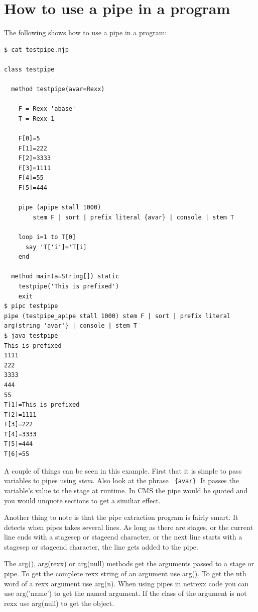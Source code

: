 \section{How to use a pipe in a \nr{} program}

The following shows how to use a pipe in a \nr{} program:

\begin{lstlisting}
$ cat testpipe.njp

class testpipe

  method testpipe(avar=Rexx)

    F = Rexx 'abase'
    T = Rexx 1

    F[0]=5
    F[1]=222
    F[2]=3333
    F[3]=1111
    F[4]=55
    F[5]=444

    pipe (apipe stall 1000)
        stem F | sort | prefix literal {avar} | console | stem T

    loop i=1 to T[0]
      say 'T['i']='T[i]
    end

  method main(a=String[]) static
    testpipe('This is prefixed')
    exit
$ pipc testpipe
pipe (testpipe_apipe stall 1000) stem F | sort | prefix literal arg(string 'avar'} | console | stem T
$ java testpipe
This is prefixed
1111
222
3333
444
55
T[1]=This is prefixed
T[2]=1111
T[3]=222
T[4]=3333
T[5]=444
T[6]=55
\end{lstlisting}

 A couple of things can be seen in this example.  First that it is
 simple to pass \nr{} variables to pipes using \emph{stem}.  Also look
 at the phrase \texttt{ \{avar\}}. It passes the \nr{} variable's value to the stage at runtime.  In CMS the pipe would be quoted and you would unquote sections to get a similiar effect.

 Another thing to note is that the pipe extraction program is fairly smart.
It detects when pipes takes several lines.
As long as there are stages, or the current line ends with a stagesep or stageend character,
or the next line starts with a stagesep or stageend character, the line gets added to the pipe.

 The arg(), arg(rexx) or arg(null) methods get the arguments passed to
     a stage or pipe.  To get the complete rexx string of an argument use
 arg(). To get the nth word of a rexx argument use arg(n).  When using
 pipes in netrexx code you can use arg('name') to get the named
 argument. If the class of the argument is not rexx use arg(null) to
 get the object.
 

